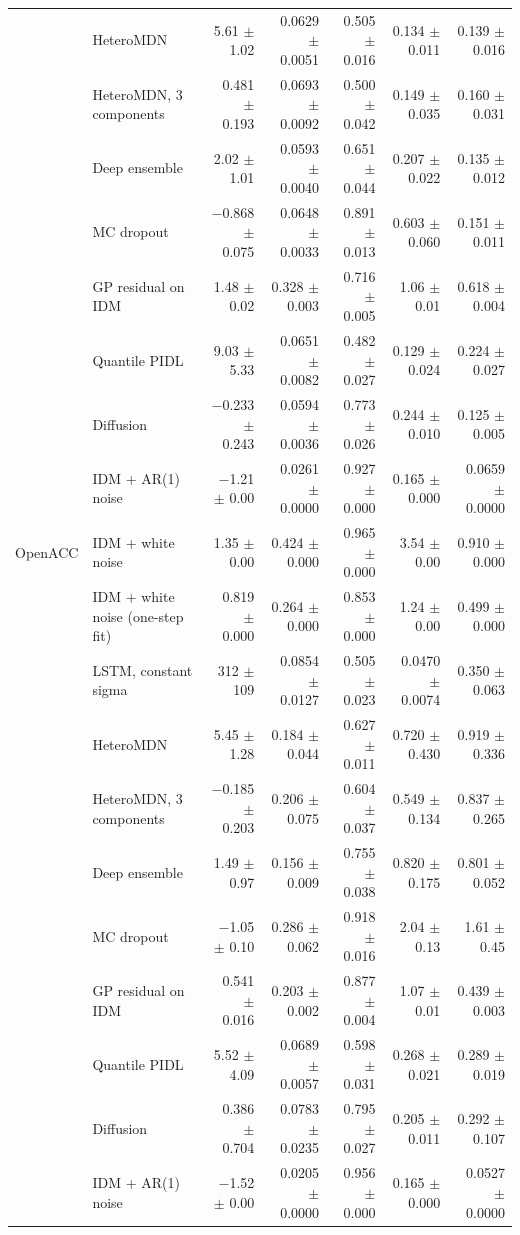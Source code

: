 \begin{longtable}{llrrrrr}
 & HeteroMDN & 5.61 $\pm$ 1.02 & 0.0629 $\pm$ 0.0051 & 0.505 $\pm$ 0.016 & 0.134 $\pm$ 0.011 & 0.139 $\pm$ 0.016 \\
 & HeteroMDN, 3 components & 0.481 $\pm$ 0.193 & 0.0693 $\pm$ 0.0092 & 0.500 $\pm$ 0.042 & 0.149 $\pm$ 0.035 & 0.160 $\pm$ 0.031 \\
 & Deep ensemble & 2.02 $\pm$ 1.01 & 0.0593 $\pm$ 0.0040 & 0.651 $\pm$ 0.044 & 0.207 $\pm$ 0.022 & 0.135 $\pm$ 0.012 \\
 & MC dropout & $-$0.868 $\pm$ 0.075 & 0.0648 $\pm$ 0.0033 & 0.891 $\pm$ 0.013 & 0.603 $\pm$ 0.060 & 0.151 $\pm$ 0.011 \\
 & GP residual on IDM & 1.48 $\pm$ 0.02 & 0.328 $\pm$ 0.003 & 0.716 $\pm$ 0.005 & 1.06 $\pm$ 0.01 & 0.618 $\pm$ 0.004 \\
 & Quantile PIDL & 9.03 $\pm$ 5.33 & 0.0651 $\pm$ 0.0082 & 0.482 $\pm$ 0.027 & 0.129 $\pm$ 0.024 & 0.224 $\pm$ 0.027 \\
 & Diffusion & $-$0.233 $\pm$ 0.243 & 0.0594 $\pm$ 0.0036 & 0.773 $\pm$ 0.026 & 0.244 $\pm$ 0.010 & 0.125 $\pm$ 0.005 \\
 & IDM + AR(1) noise & $-$1.21 $\pm$ 0.00 & 0.0261 $\pm$ 0.0000 & 0.927 $\pm$ 0.000 & 0.165 $\pm$ 0.000 & 0.0659 $\pm$ 0.0000 \\
\midrule
OpenACC & IDM + white noise & 1.35 $\pm$ 0.00 & 0.424 $\pm$ 0.000 & 0.965 $\pm$ 0.000 & 3.54 $\pm$ 0.00 & 0.910 $\pm$ 0.000 \\
 & IDM + white noise (one-step fit) & 0.819 $\pm$ 0.000 & 0.264 $\pm$ 0.000 & 0.853 $\pm$ 0.000 & 1.24 $\pm$ 0.00 & 0.499 $\pm$ 0.000 \\
 & LSTM, constant sigma & 312 $\pm$ 109 & 0.0854 $\pm$ 0.0127 & 0.505 $\pm$ 0.023 & 0.0470 $\pm$ 0.0074 & 0.350 $\pm$ 0.063 \\
 & HeteroMDN & 5.45 $\pm$ 1.28 & 0.184 $\pm$ 0.044 & 0.627 $\pm$ 0.011 & 0.720 $\pm$ 0.430 & 0.919 $\pm$ 0.336 \\
 & HeteroMDN, 3 components & $-$0.185 $\pm$ 0.203 & 0.206 $\pm$ 0.075 & 0.604 $\pm$ 0.037 & 0.549 $\pm$ 0.134 & 0.837 $\pm$ 0.265 \\
 & Deep ensemble & 1.49 $\pm$ 0.97 & 0.156 $\pm$ 0.009 & 0.755 $\pm$ 0.038 & 0.820 $\pm$ 0.175 & 0.801 $\pm$ 0.052 \\
 & MC dropout & $-$1.05 $\pm$ 0.10 & 0.286 $\pm$ 0.062 & 0.918 $\pm$ 0.016 & 2.04 $\pm$ 0.13 & 1.61 $\pm$ 0.45 \\
 & GP residual on IDM & 0.541 $\pm$ 0.016 & 0.203 $\pm$ 0.002 & 0.877 $\pm$ 0.004 & 1.07 $\pm$ 0.01 & 0.439 $\pm$ 0.003 \\
 & Quantile PIDL & 5.52 $\pm$ 4.09 & 0.0689 $\pm$ 0.0057 & 0.598 $\pm$ 0.031 & 0.268 $\pm$ 0.021 & 0.289 $\pm$ 0.019 \\
 & Diffusion & 0.386 $\pm$ 0.704 & 0.0783 $\pm$ 0.0235 & 0.795 $\pm$ 0.027 & 0.205 $\pm$ 0.011 & 0.292 $\pm$ 0.107 \\
 & IDM + AR(1) noise & $-$1.52 $\pm$ 0.00 & 0.0205 $\pm$ 0.0000 & 0.956 $\pm$ 0.000 & 0.165 $\pm$ 0.000 & 0.0527 $\pm$ 0.0000 \\
\end{longtable}
\endgroup

